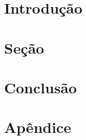 \documentclass[12pt, a4paper]{article}
\title{}
\author{}
\date{}
\begin{document}
\begin{titlepage}
\clearpage\maketitle
\thispagestyle{empty}
\begin{abstract}
\end{abstract}
\end{titlepage}

	\section{Introdução} \label{sec:introduction}
	
	\section{Seção} \label{sec:}
	
	\section{Conclusão} \label{sec:conclusion}
	
	\newpage
	
	
	\newpage
	\appendix
	\section{Apêndice} \label{sec:appendix}
	
\end{document}
